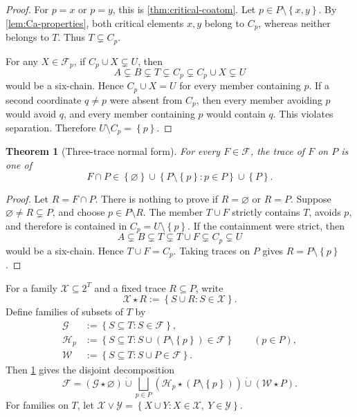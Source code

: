 \documentclass[11pt,reqno]{amsart}
\numberwithin{equation}{section}
\newtheorem{theorem}{Theorem}[section]
\theoremstyle{definition}
\theoremstyle{remark}
\newcommand{\F}{\mathcal{F}}
\newcommand{\G}{\mathcal{G}}
\newcommand{\Hh}{\mathcal{H}}
\newcommand{\W}{\mathcal{W}}
\newcommand{\1}{\mathbf{1}}
\newcommand{\set}[1]{\left\{#1\right\}}
\newcommand{\join}{\mathbin{\vee}}
\begin{document}
\begin{proof}
For \(p=x\) or \(p=y\), this is \cref{thm:critical-coatom}.  Let \(p\in P\setminus\set{x,y}\).  By \cref{lem:Ca-properties}, both critical elements \(x,y\) belong to \(C_p\), whereas neither belongs to \(T\).  Thus \(T\subsetneq C_p\).

For any \(X\in\F_p\), if \(C_p\cup X\subsetneq U\), then
\[
A\subsetneq B\subsetneq T
\subsetneq C_p
\subsetneq C_p\cup X
\subsetneq U
\]
would be a six-chain.  Hence \(C_p\cup X=U\) for every member containing \(p\).  If a second coordinate \(q\ne p\) were absent from \(C_p\), then every member avoiding \(p\) would avoid \(q\), and every member containing \(p\) would contain \(q\).  This violates separation.  Therefore \(U\setminus C_p=\set{p}\).
\end{proof}

\begin{theorem}[Three-trace normal form]\label{thm:trace-normal}
For every \(F\in\F\), the trace of \(F\) on \(P\) is one of
\begin{equation}\label{eq:three-traces}
\boxed{
F\cap P\in
\set{\varnothing}
\cup
\set{P\setminus\set{p}:p\in P}
\cup
\set{P}.}
\end{equation}
\end{theorem}

\begin{proof}
Let \(R=F\cap P\).  There is nothing to prove if \(R=\varnothing\) or \(R=P\).  Suppose \(\varnothing\ne R\subsetneq P\), and choose \(p\in P\setminus R\).  The member \(T\cup F\) strictly contains \(T\), avoids \(p\), and therefore is contained in \(C_p=U\setminus\set{p}\).  If the containment were strict, then
\[
A\subsetneq B\subsetneq T
\subsetneq T\cup F
\subsetneq C_p
\subsetneq U
\]
would be a six-chain.  Hence \(T\cup F=C_p\).  Taking traces on \(P\) gives \(R=P\setminus\set{p}\).
\end{proof}

For a family \(\mathcal X\subseteq2^T\) and a fixed trace \(R\subseteq P\), write
\[
\mathcal X\star R:=\set{S\cup R:S\in\mathcal X}.
\]
Define families of subsets of \(T\) by
\begin{align*}
\G&:=\set{S\subseteq T:S\in\F},\\
\Hh_p&:=\set{S\subseteq T:S\cup(P\setminus\set{p})\in\F}
\qquad(p\in P),\\
\W&:=\set{S\subseteq T:S\cup P\in\F}.
\end{align*}
Then \cref{thm:trace-normal} gives the disjoint decomposition
\begin{equation}\label{eq:layer-decomp}
\F
=
(\G\star\varnothing)
\mathbin{\dot\cup}
\bigsqcup_{p\in P}(\Hh_p\star(P\setminus\set{p}))
\mathbin{\dot\cup}
(\W\star P).
\end{equation}
For families on \(T\), let
\(
\mathcal X\join\mathcal Y=
\set{X\cup Y:X\in\mathcal X,\ Y\in\mathcal Y}
\).
\end{document}
